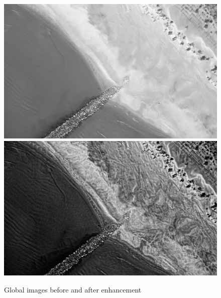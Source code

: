 \begin{figure}
\begin{center}
\includegraphics[width=160mm]{FIGS/Tapioca-SFS/Im-STD.jpg}
\includegraphics[width=160mm]{FIGS/Tapioca-SFS/Im-SFS.jpg}
\end{center}
\caption{Global images before and after enhancement}
\label{FIG:SF:TieP}
\end{figure}



